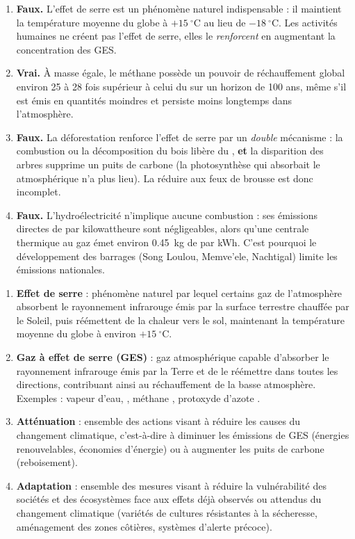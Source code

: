 \documentclass[11pt]{article}
\begin{document}
\begin{corrige}
\begin{enumerate}
\item \textbf{Faux.} L'effet de serre est un phénomène naturel indispensable : il maintient la température moyenne du globe à $+15\ ^\circ\mathrm{C}$ au lieu de $-18\ ^\circ\mathrm{C}$. Les activités humaines ne créent pas l'effet de serre, elles le \emph{renforcent} en augmentant la concentration des GES.
\item \textbf{Vrai.} À masse égale, le méthane possède un pouvoir de réchauffement global environ 25 à 28 fois supérieur à celui du  sur un horizon de 100 ans, même s'il est émis en quantités moindres et persiste moins longtemps dans l'atmosphère.
\item \textbf{Faux.} La déforestation renforce l'effet de serre par un \emph{double} mécanisme : la combustion ou la décomposition du bois libère du , \textbf{et} la disparition des arbres supprime un puits de carbone (la photosynthèse qui absorbait le  atmosphérique n'a plus lieu). La réduire aux feux de brousse est donc incomplet.
\item \textbf{Faux.} L'hydroélectricité n'implique aucune combustion : ses émissions directes de  par kilowattheure sont négligeables, alors qu'une centrale thermique au gaz émet environ \SI{0,45}{kg} de  par kWh. C'est pourquoi le développement des barrages (Song Loulou, Memve'ele, Nachtigal) limite les émissions nationales.
\end{enumerate}
\end{corrige}

\begin{corrige}
\begin{enumerate}
\item \textbf{Effet de serre} : phénomène naturel par lequel certains gaz de l'atmosphère absorbent le rayonnement infrarouge émis par la surface terrestre chauffée par le Soleil, puis réémettent de la chaleur vers le sol, maintenant la température moyenne du globe à environ $+15\ ^\circ\mathrm{C}$.
\item \textbf{Gaz à effet de serre (GES)} : gaz atmosphérique capable d'absorber le rayonnement infrarouge émis par la Terre et de le réémettre dans toutes les directions, contribuant ainsi au réchauffement de la basse atmosphère. Exemples : vapeur d'eau, , méthane , protoxyde d'azote .
\item \textbf{Atténuation} : ensemble des actions visant à réduire les causes du changement climatique, c'est-à-dire à diminuer les émissions de GES (énergies renouvelables, économies d'énergie) ou à augmenter les puits de carbone (reboisement).
\item \textbf{Adaptation} : ensemble des mesures visant à réduire la vulnérabilité des sociétés et des écosystèmes face aux effets déjà observés ou attendus du changement climatique (variétés de cultures résistantes à la sécheresse, aménagement des zones côtières, systèmes d'alerte précoce).
\end{enumerate}
\end{corrige}
\end{document}

